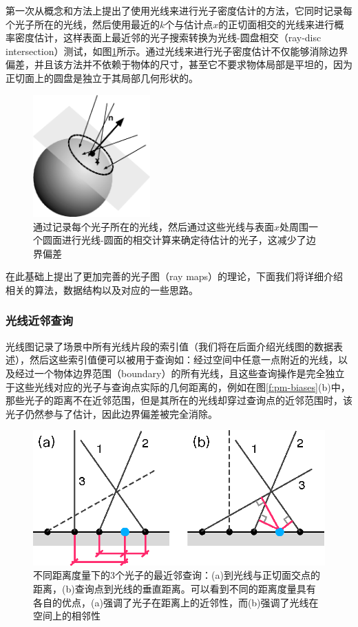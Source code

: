 \cite{a:AParticlePathbasedMethodforMonteCarloDensityEstimation}第一次从概念和方法上提出了使用光线来进行光子密度估计的方法，它同时记录每个光子所在的光线，然后使用最近的$k$个与估计点$x$的正切面相交的光线来进行概率密度估计，这样表面上最近邻的光子搜索转换为光线-圆盘相交（ray-disc intersection）测试，如图\ref{f:pm-ray-disc}所示。通过光线来进行光子密度估计不仅能够消除边界偏差，并且该方法并不依赖于物体的尺寸，甚至它不要求物体局部是平坦的，因为正切面上的圆盘是独立于其局部几何形状的。

\begin{figure}
	\sidecaption
	\includegraphics[width=0.4\textwidth]{figures/pm/ray-disc}
	\caption{\cite{a:AParticlePathbasedMethodforMonteCarloDensityEstimation}通过记录每个光子所在的光线，然后通过这些光线与表面$x$处周围一个圆面进行光线-圆面的相交计算来确定待估计的光子，这减少了边界偏差}
	\label{f:pm-ray-disc}
\end{figure}

\cite{a:RayMapsforGlobalIllumination}在此基础上提出了更加完善的光子图（ray maps）的理论，下面我们将详细介绍相关的算法，数据结构以及对应的一些思路。




\subsubsection{光线近邻查询}
光线图记录了场景中所有光线片段的索引值（我们将在后面介绍光线图的数据表述），然后这些索引值便可以被用于查询如：经过空间中任意一点附近的光线，以及经过一个物体边界范围（boundary）的所有光线，且这些查询操作是完全独立于这些光线对应的光子与查询点实际的几何距离的，例如在图\ref{f:pm-biases}(b)中，那些光子的距离不在近邻范围，但是其所在的光线却穿过查询点的近邻范围时，该光子仍然参与了估计，因此边界偏差被完全消除。

\begin{figure}
\sidecaption
	\includegraphics[width=.65\textwidth]{figures/pm/ray-proximity-queries}
	\caption{不同距离度量下的3个光子的最近邻查询：(a)到光线与正切面交点的距离，(b)查询点到光线的垂直距离。可以看到不同的距离度量具有各自的优点，(a)强调了光子在距离上的近邻性，而(b)强调了光线在空间上的相邻性}
	\label{f:pm-ray-proximity-queries}
\end{figure}

